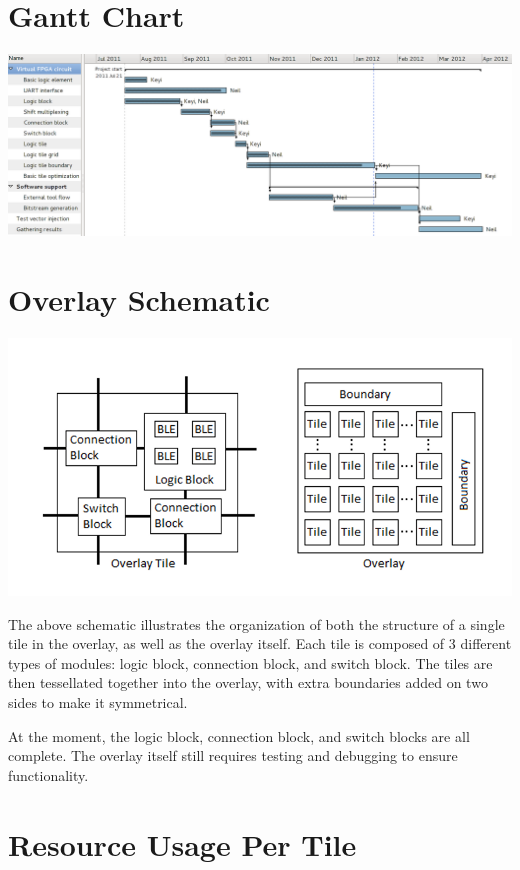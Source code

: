 \documentclass[12pt,letterpaper]{article}
\begin{document}
\pagebreak
\begin{appendices}

\pagebreak

\section{Gantt Chart}
\includegraphics[scale=0.45,angle=90]{gantt.png}

\pagebreak
\section{Overlay Schematic}

\includegraphics[scale=0.7]{overlay.png}

The above schematic illustrates the organization of both the structure of a single tile in the overlay, as well as the overlay itself.
Each tile is composed of 3 different types of modules: logic block, connection block, and switch block.
The tiles are then tessellated together into the overlay, with extra boundaries added on two sides to make it symmetrical.

At the moment, the logic block, connection block, and switch blocks are all complete. The overlay itself still requires testing and debugging to ensure functionality.

\pagebreak
\section{Resource Usage Per Tile}


\end{appendices}
\end{document}
